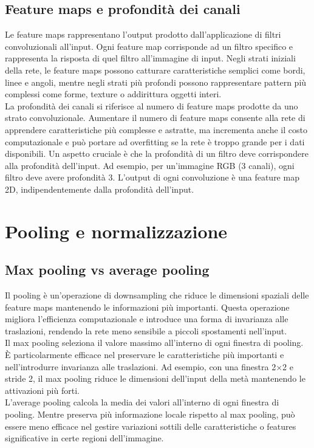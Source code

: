 \documentclass[a4paper,12pt]{report}
\begin{document}
	\subsection{Feature maps e profondità dei canali}
	Le feature maps rappresentano l'output prodotto dall'applicazione di filtri convoluzionali all'input. Ogni feature map corrisponde ad un filtro specifico e rappresenta la risposta di quel filtro all'immagine di input. Negli strati iniziali della rete, le feature maps possono catturare caratteristiche semplici come bordi, linee e angoli, mentre negli strati più profondi possono rappresentare pattern più complessi come forme, texture o addirittura oggetti interi. \\
	La profondità dei canali si riferisce al numero di feature maps prodotte da uno strato convoluzionale. Aumentare il numero di feature maps consente alla rete di apprendere caratteristiche più complesse e astratte, ma incrementa anche il costo computazionale e può portare ad overfitting se la rete è troppo grande per i dati disponibili. Un aspetto cruciale è che la profondità di un filtro deve corrispondere alla profondità dell'input. Ad esempio, per un'immagine RGB (3 canali), ogni filtro deve avere profondità 3. L'output di ogni convoluzione è una feature map 2D, indipendentemente dalla profondità dell'input.
	
	\section{Pooling e normalizzazione}
	
	\subsection{Max pooling vs average pooling}
	Il pooling è un'operazione di downsampling che riduce le dimensioni spaziali delle feature maps mantenendo le informazioni più importanti. Questa operazione migliora l'efficienza computazionale e introduce una forma di invarianza alle traslazioni, rendendo la rete meno sensibile a piccoli spostamenti nell'input. \\
	Il max pooling seleziona il valore massimo all'interno di ogni finestra di pooling. È particolarmente efficace nel preservare le caratteristiche più importanti e nell'introdurre invarianza alle traslazioni. Ad esempio, con una finestra 2$\times$2 e stride 2, il max pooling riduce le dimensioni dell'input della metà mantenendo le attivazioni più forti. \\
	L'average pooling calcola la media dei valori all'interno di ogni finestra di pooling. Mentre preserva più informazione locale rispetto al max pooling, può essere meno efficace nel gestire variazioni sottili delle caratteristiche o features significative in certe regioni dell'immagine.
	
\end{document}
